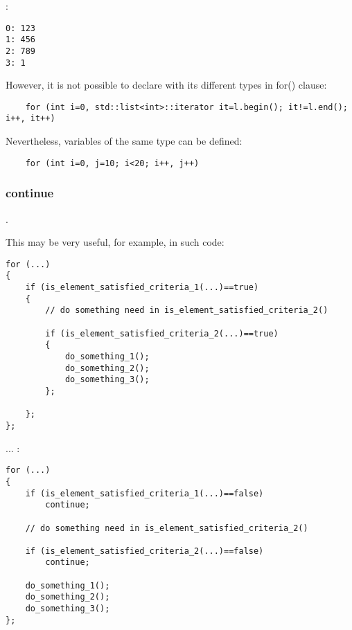 

:

\begin{lstlisting}
0: 123
1: 456
2: 789
3: 1
\end{lstlisting}

{However, it is not possible to declare  with its different types in for() clause}:

\begin{lstlisting}
	for (int i=0, std::list<int>::iterator it=l.begin(); it!=l.end(); i++, it++)
\end{lstlisting}

{Nevertheless, variables of the same type can be defined}:

\begin{lstlisting}
	for (int i=0, j=10; i<20; i++, j++)
\end{lstlisting}


\subsubsection{continue}

 .

{This may be very useful, for example, in such code}:

\begin{lstlisting}
for (...)
{
	if (is_element_satisfied_criteria_1(...)==true)
	{
		// do something need in is_element_satisfied_criteria_2()

		if (is_element_satisfied_criteria_2(...)==true)
		{
			do_something_1();
			do_something_2();
			do_something_3();
		};

	};
};
\end{lstlisting}

... :

\begin{lstlisting}
for (...)
{
	if (is_element_satisfied_criteria_1(...)==false)
		continue;

	// do something need in is_element_satisfied_criteria_2()

	if (is_element_satisfied_criteria_2(...)==false)
		continue;

	do_something_1();
	do_something_2();
	do_something_3();
};
\end{lstlisting}

